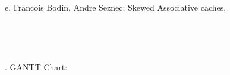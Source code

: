 \documentclass[12pt]{article}
\begin{document}
{\fontsize{16pt}{19.2pt}\selectfont e. Francois Bodin, Andre Seznec: Skewed Associative caches.\par}\par





\begin{figure}[H]	\begin{subfigure}		\texttt{[image: ./media/image5.jpeg]}
	\end{subfigure}
~	\begin{subfigure}		\texttt{[image: ./media/image6.jpeg]}
	\end{subfigure}
~
\end{figure}



{\fontsize{22pt}{26.4pt}. GANTT Chart:\par}\par


\vspace{\baselineskip}

\vspace{\baselineskip}

\printbibliography
\end{document}
